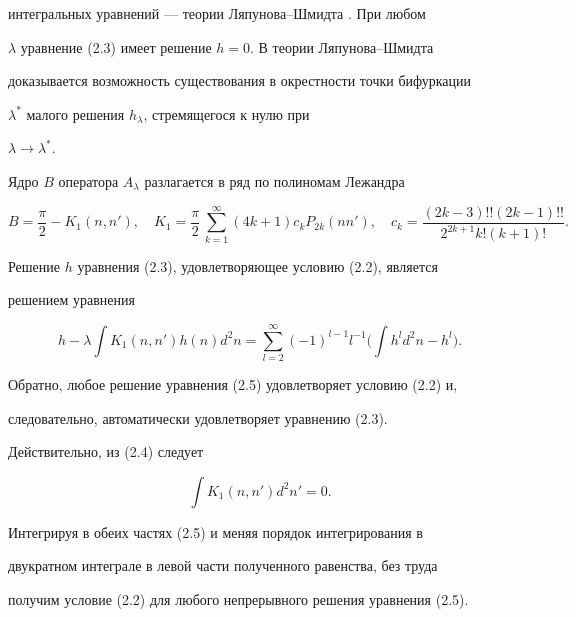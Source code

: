 интегральных уравнений --- теории Ляпунова--Шмидта \cite{2}. При любом


$\lambda$ уравнение (2.3) имеет решение $h=0$. В теории Ляпунова--Шмидта


доказывается возможность существования в окрестности точки бифуркации


$\lambda^*$ малого решения $h_\lambda$, стремящегося к нулю при


$\lambda\to\lambda^*$.





Ядро $B$ оператора $A_\lambda$ разлагается в ряд по полиномам Лежандра


\cite{3}


\begin{equation}


B=\frac{\pi}{2}-K_1(n,n'),\quad


K_1=\frac{\pi}{2}\,\sum^\infty_{k=1}(4k+1)c_k P_{2k}(nn'),\quad


c_k=\frac{(2k-3)!!(2k-1)!!}{2^{2k+1}k!(k+1)!}.


\tag{2.4}


\end{equation}


Решение $h$ уравнения (2.3), удовлетворяющее условию (2.2), является


решением уравнения


\begin{equation}


h-\lambda\int K_1(n,n')h(n)d^2n=


\sum^\infty_{l=2}(-1)^{l-1}l^{-1}


\biggl(\int h^l d^2n-h^l \biggr).


\tag{2.5}


\end{equation}


Обратно, любое решение уравнения (2.5) удовлетворяет условию (2.2) и,


следовательно, автоматически удовлетворяет уравнению (2.3).


Действительно, из (2.4) следует


$$


\int K_1(n,n')d^2n'=0.


$$


Интегрируя в обеих частях (2.5) и меняя порядок интегрирования в


двукратном интеграле в левой части полученного равенства, без труда


получим условие (2.2) для любого непрерывного решения уравнения (2.5).





